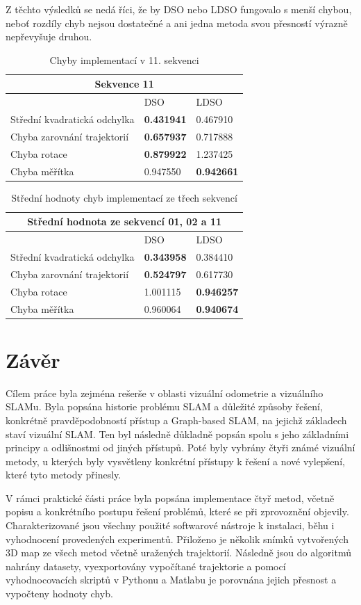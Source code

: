 \documentclass[12pt,a4paper]{report}
\begin{document}
Z těchto výsledků se nedá říci, že by DSO nebo LDSO fungovalo s menší chybou, neboť rozdíly chyb nejsou dostatečné a ani jedna metoda svou přesností výrazně nepřevyšuje druhou.
\begin{table}[H]
\centering
\begin{tabular}{|l|l|l|}
\hline
\multicolumn{3}{|c|}{\textbf{Sekvence 11}} \\
\hline
 & DSO & LDSO \\
\hline
Střední kvadratická odchylka & \textbf{0.431941} & 0.467910 \\
Chyba zarovnání trajektorií & \textbf{0.657937} & 0.717888 \\
Chyba rotace & \textbf{0.879922} & 1.237425 \\
Chyba měřítka & 0.947550 & \textbf{0.942661} \\
\hline
\end{tabular}
\caption{Chyby implementací v 11. sekvenci}
\end{table}


\noindent
\begin{table}[H]
\centering
\begin{tabular}{|l|l|l|}
\hline
\multicolumn{3}{|c|}{\textbf{Střední hodnota ze sekvencí 01, 02 a 11}} \\
\hline
 & DSO & LDSO \\
\hline
Střední kvadratická odchylka & \textbf{0.343958} & 0.384410 \\
Chyba zarovnání trajektorií & \textbf{0.524797} & 0.617730 \\
Chyba rotace & 1.001115 & \textbf{0.946257} \\
Chyba měřítka & 0.960064 & \textbf{0.940674} \\
\hline
\end{tabular}
\caption{Střední hodnoty chyb implementací ze třech sekvencí}
\end{table}


\chapter{Závěr}
Cílem práce byla zejména rešerše v oblasti vizuální odometrie a vizuálního SLAMu. Byla popsána historie problému SLAM a důležité způsoby řešení, konkrétně pravděpodobností přístup a Graph-based SLAM, na jejichž základech staví vizuální SLAM. Ten byl následně důkladně popsán spolu s jeho základními principy a odlišnostmi od jiných přístupů. Poté byly vybrány čtyři známé vizuální metody, u kterých byly vysvětleny konkrétní přístupy k řešení a nové vylepšení, které tyto metody přinesly.

V rámci praktické části práce byla popsána implementace čtyř metod, včetně popisu a konkrétního postupu řešení problémů, které se při zprovoznění objevily. Charakterizované jsou všechny použité softwarové nástroje k instalaci, běhu i vyhodnocení provedených experimentů. Přiloženo je několik snímků vytvořených 3D map ze všech metod včetně uražených trajektorií. Následně jsou do algoritmů nahrány datasety, vyexportovány vypočítané trajektorie a pomocí vyhodnocovacích skriptů v Pythonu a Matlabu je porovnána jejich přesnost a vypočteny hodnoty chyb.


\newpage

\end{document}
